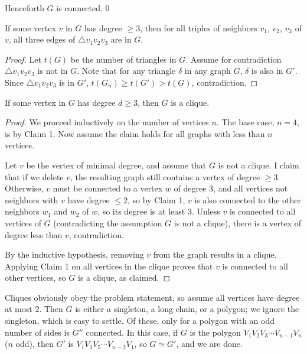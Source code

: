 Henceforth $G$ is connected.
\setcounter{claim}0
\begin{claim}
    If some vertex $v$ in $G$ has degree $\ge3$, then for all triples of neighbors $v_1$, $v_2$, $v_3$ of $v$, all three edges of $\triangle v_1v_2v_3$ are in $G$.
\end{claim}
\begin{proof}
    Let $t(G)$ be the number of triangles in $G$. Assume for contradiction $\triangle v_1v_2v_3$ is not in $G$. Note that for any triangle $\delta$ in any graph $G$, $\delta$ is also in $G'$. Since $\triangle v_1v_2v_3$ is in $G'$, $t(G_n)\ge t(G')>t(G)$, contradiction.
\end{proof}
\begin{claim}
    If some vertex in $G$ has degree $d\ge3$, then $G$ is a clique.
\end{claim}
\begin{proof}
    We proceed inductively on the number of vertices $n$. The base case, $n=4$, is by Claim 1. Now assume the claim holds for all graphs with less than $n$ vertices.

    Let $v$ be the vertex of minimal degree, and assume that $G$ is not a clique. I claim that if we delete $v$, the resulting graph still contains a vertex of degree $\ge3$. Otherwise, $v$ must be connected to a vertex $w$ of degree $3$, and all vertices not neighbors with $v$ have degree $\le2$, so by Claim 1, $v$ is also connected to the other neighbors $w_1$ and $w_2$ of $w$, so its degree is at least $3$. Unless $v$ is connected to all vertices of $G$ (contradicting the assumption $G$ is not a clique), there is a vertex of degree less than $v$, contradiction.

    By the inductive hypothesis, removing $v$ from the graph results in a clique. Applying Claim 1 on all vertices in the clique proves that $v$ is connected to all other vertices, so $G$ is a clique, as claimed.
\end{proof}

Cliques obviously obey the problem statement, so assume all vertices have degree at most $2$. Then $G$ is either a singleton, a long chain, or a polygon; we ignore the singleton, which is easy to settle. Of these, only for a polygon with an odd number of sides is $G''$ connected. In this case, if $G$ is the polygon $V_1V_2V_3\cdots V_{n-1}V_n$ ($n$ odd), then $G'$ is $V_1V_3V_5\cdots V_{n-2}V_1$, so $G\simeq G'$, and we are done.
